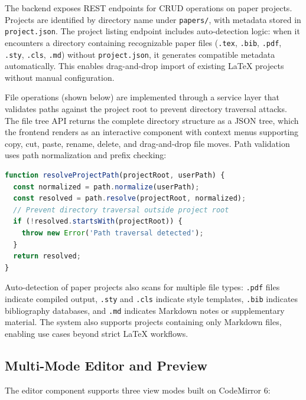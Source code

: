 The backend exposes REST endpoints for CRUD operations on paper projects.
Projects are identified by directory name under \texttt{papers/}, with metadata
stored in \texttt{project.json}. The project listing endpoint includes
auto-detection logic: when it encounters a directory containing recognizable
paper files (\texttt{.tex}, \texttt{.bib}, \texttt{.pdf}, \texttt{.sty},
\texttt{.cls}, \texttt{.md}) without \texttt{project.json}, it generates
compatible metadata automatically. This enables drag-and-drop import of
existing \LaTeX{} projects without manual configuration.

File operations (shown below) are implemented through a service
layer that validates paths against the project root to prevent directory
traversal attacks. The file tree API returns the complete directory structure
as a JSON tree, which the frontend renders as an interactive component with
context menus supporting copy, cut, paste, rename, delete, and drag-and-drop
file moves. Path validation uses path normalization and prefix checking:

\begin{lstlisting}[language=JavaScript, caption={Path security validation pattern}]
function resolveProjectPath(projectRoot, userPath) {
  const normalized = path.normalize(userPath);
  const resolved = path.resolve(projectRoot, normalized);
  // Prevent directory traversal outside project root
  if (!resolved.startsWith(projectRoot)) {
    throw new Error('Path traversal detected');
  }
  return resolved;
}
\end{lstlisting}

Auto-detection of paper projects also scans for multiple file types:
\texttt{.pdf} files indicate compiled output, \texttt{.sty} and \texttt{.cls}
indicate style templates, \texttt{.bib} indicates bibliography databases, and
\texttt{.md} indicates Markdown notes or supplementary material. The system
also supports projects containing only Markdown files, enabling use cases
beyond strict \LaTeX{} workflows.

\subsection{Multi-Mode Editor and Preview}

The editor component supports three view modes built on CodeMirror 6:

